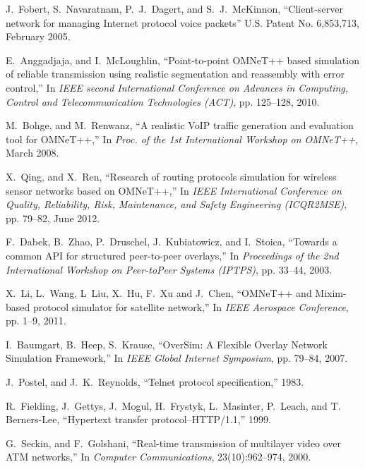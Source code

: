 \documentclass[conference]{IEEEtran}
\begin{document}
\begin{thebibliography}{10}
J.~Fobert, S.~Navaratnam, P.~J.~Dagert, and S.~J.~McKinnon,
\newblock ``Client-server network for managing Internet protocol
voice packets''
\newblock U.S. Patent No. 6,853,713, February 2005.


E.~Anggadjaja, and I.~McLoughlin,
\newblock ``Point-to-point OMNeT++ based simulation of reliable transmission
using realistic segmentation and reassembly with error control,''
\newblock In {\em IEEE second International Conference on Advances in
Computing, Control and Telecommunication Technologies (ACT)}, pp. 125--128,
2010.

M.~Bohge, and M.~Renwanz,
\newblock ``A realistic VoIP traffic generation and evaluation tool for
OMNeT++,''
\newblock In {\em Proc. of the 1st International Workshop on OMNeT++},
March 2008.

X.~Qing, and X.~Ren,
\newblock ``Research of routing protocols simulation for wireless sensor
networks based on OMNeT++,''
\newblock In {\em IEEE International Conference on Quality, Reliability, Risk,
Maintenance, and Safety Engineering (ICQR2MSE)}, pp. 79--82, June 2012.

F.~Dabek, B.~Zhao, P.~Druschel, J.~Kubiatowicz, and I.~Stoica, 
\newblock ``Towards a common API for structured peer-to-peer overlays,'' 
\newblock In {\em Proceedings of the 2nd International Workshop on Peer-toPeer Systems (IPTPS)}, pp. 33--44, 2003.

X.~Li, L.~Wang, L~Liu, X.~Hu, F.~Xu and J.~Chen, 
\newblock ``OMNeT++ and Mixim-based protocol simulator for satellite network,'' 
\newblock In {\em IEEE Aerospace Conference}, pp. 1--9, 2011.

I.~Baumgart, B.~Heep, S.~Krause,
\newblock ``OverSim: A Flexible Overlay Network Simulation Framework,''
\newblock In {\em IEEE Global Internet Symposium}, pp. 79--84, 2007.

J.~Postel, and J.~K.~Reynolds,
\newblock ``Telnet protocol specification,'' 1983.

R.~Fielding, J.~Gettys, J.~Mogul, H.~Frystyk, L.~Masinter, P.~Leach, and T.~
Berners-Lee,
\newblock ``Hypertext transfer protocol–HTTP/1.1,'' 1999.

G.~Seckin, and F.~Golshani,
\newblock ``Real-time transmission of multilayer video over ATM networks,''
\newblock In {\em Computer Communications}, 23(10):962--974, 2000.


\end{thebibliography}

%
\end{document}
